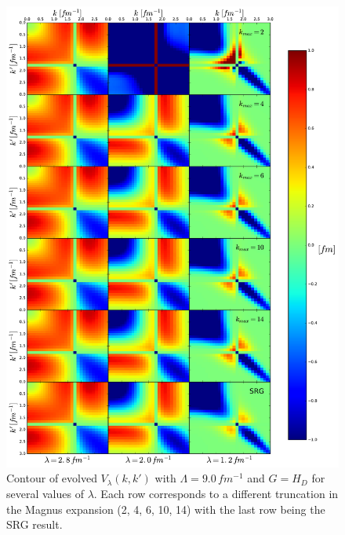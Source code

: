\documentclass[preprintnumbers,floatfix,aps,prc,preprint]{revtex4-1}
\begin{document}
\begin{figure}[H]
  \centering
  \includegraphics[width=15cm]{mag_contours_Wendt_9_Wegner}
   \hspace*{0.05\textwidth}%
  \caption{Contour of evolved $V_{\lambda}(k,k')$ with $\Lambda=9.0\,fm^{-1}$ and $G=H_{D}$ for several values of $\lambda$. Each row corresponds to a different truncation in the Magnus expansion (2, 4, 6, 10, 14) with the last row being the SRG result.}
  \label{fig:mag_contours_Wendt_9_Wegner}
\end{figure}
%
\end{document}
